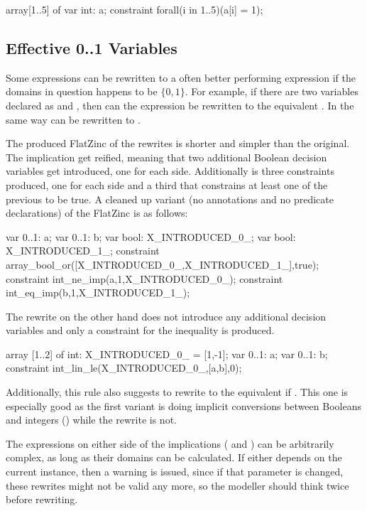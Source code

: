 \documentclass[a4paper,12pt]{article}
\begin{document}
\begin{mznnobreak}[label=lst:constvar,caption={\null}]
array[1..5] of var int: a;
constraint forall(i in 1..5)(a[i] = 1);
\end{mznnobreak}

\subsection{Effective 0..1 Variables}\label{sec:rule:zeroone}
Some expressions can be rewritten to a often better performing expression if the domains in
question happens to be $\{0,1\}$. For example, if there are two variables declared as
 and , then can the expression  be rewritten
to the equivalent . In the same way can  be rewritten to .

The produced FlatZinc of the rewrites is shorter and simpler than the original. The
implication get reified, meaning that two additional Boolean decision variables get
introduced, one for each side. Additionally is three constraints produced, one for each
side and a third that constrains at least one of the previous to be true. A cleaned up
variant (no annotations and no predicate declarations) of the FlatZinc is as follows:
\begin{mznnobreak}
var 0..1: a;
var 0..1: b;
var bool: X_INTRODUCED_0_;
var bool: X_INTRODUCED_1_;
constraint array_bool_or([X_INTRODUCED_0_,X_INTRODUCED_1_],true);
constraint int_ne_imp(a,1,X_INTRODUCED_0_);
constraint int_eq_imp(b,1,X_INTRODUCED_1_);
\end{mznnobreak}
The rewrite on the other hand does not introduce any additional decision variables and
only a constraint for the inequality is produced.
\begin{mznnobreak}
array [1..2] of int: X_INTRODUCED_0_ = [1,-1];
var 0..1: a;
var 0..1: b;
constraint int_lin_le(X_INTRODUCED_0_,[a,b],0);
\end{mznnobreak}

\begin{sloppypar}
Additionally, this rule also suggests to rewrite  to the
equivalent  if . This one is especially good
as the first variant is doing implicit conversions between Booleans and integers
() while the rewrite is not.
\end{sloppypar}

The expressions on either side of the implications ( and ) can be arbitrarily
complex, as long as their domains can be calculated. If either depends on the current
instance, then a warning is issued, since if that parameter is changed, these rewrites
might not be valid any more, so the modeller should think twice before rewriting.
\end{document}
